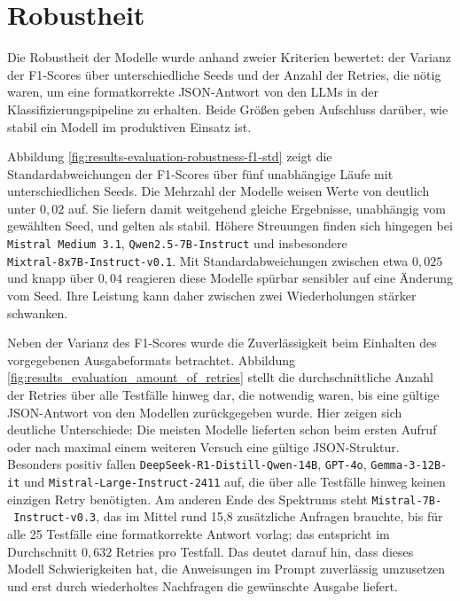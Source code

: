 \section{Robustheit}\label{sec:robustheit}

Die Robustheit der Modelle wurde anhand zweier Kriterien bewertet: der Varianz der F1‑Scores über unterschiedliche Seeds und der Anzahl der Retries, die nötig waren, um eine formatkorrekte JSON‑Antwort von den \acp{LLM} in der Klassifizierungspipeline zu erhalten. Beide Größen geben Aufschluss darüber, wie stabil ein Modell im produktiven Einsatz ist.

Abbildung \ref{fig:results-evaluation-robustness-f1-std} zeigt die Standardabweichungen der F1‑Scores über fünf unabhängige Läufe mit unterschiedlichen Seeds. Die Mehrzahl der Modelle weisen Werte von deutlich unter $0{,}02$ auf. Sie liefern damit weitgehend gleiche Ergebnisse, unabhängig vom gewählten Seed, und gelten als stabil. Höhere Streuungen finden sich hingegen bei \texttt{Mistral Medium 3.1}, \texttt{Qwen2.5‑7B‑Instruct} und insbesondere \texttt{Mixtral‑8x7B‑Instruct‑v0.1}. Mit Standardabweichungen zwischen etwa $0{,}025$ und knapp über $0{,}04$ reagieren diese Modelle spürbar sensibler auf eine Änderung vom Seed. Ihre Leistung kann daher zwischen zwei Wiederholungen stärker schwanken.

Neben der Varianz des F1-Scores wurde die Zuverlässigkeit beim Einhalten des vorgegebenen Ausgabeformats betrachtet. Abbildung \ref{fig:results_evaluation_amount_of_retries} stellt die durchschnittliche Anzahl der Retries über alle Testfälle hinweg dar, die notwendig waren, bis eine gültige JSON-Antwort von den Modellen zurückgegeben wurde. Hier zeigen sich deutliche Unterschiede: Die meisten Modelle lieferten schon beim ersten Aufruf oder nach maximal einem weiteren Versuch eine gültige JSON‑Struktur. Besonders positiv fallen \texttt{DeepSeek‑R1‑Distill‑Qwen‑14B}, \texttt{GPT‑4o}, \texttt{Gemma‑3‑12B-it} und \texttt{Mistral‑Large‑Instruct‑2411} auf, die über alle Testfälle hinweg keinen einzigen Retry benötigten. Am anderen Ende des Spektrums steht \texttt{Mistral-7B-\linebreak~Instruct-v0.3}, das im Mittel rund 15,8 zusätzliche Anfragen brauchte, bis für alle 25 Testfälle eine formatkorrekte Antwort vorlag; das entspricht im Durchschnitt $0{,}632$ Retries pro Testfall. Das deutet darauf hin, dass dieses Modell Schwierigkeiten hat, die Anweisungen im Prompt zuverlässig umzusetzen und erst durch wiederholtes Nachfragen die gewünschte Ausgabe liefert.

